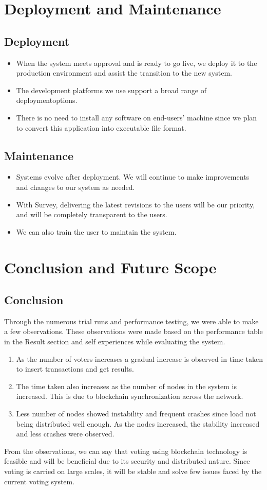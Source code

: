 \documentclass[oneside, 12pt]{book}
\begin{document}
	\section{Deployment and Maintenance}
	\newpage
		\subsection{Deployment}
			\begin{itemize}
				\item When the system meets approval and is ready to go live, we deploy it to the production environment and assist the transition to the new system.
				\item The development platforms we use support a broad range of deploymentoptions.
				\item There is no need to install any software on end-users’ machine since we plan to convert this application into executable file format.
			\end{itemize}
		\subsection{Maintenance}
			\begin{itemize}
				\item Systems evolve after deployment. We will continue to make improvements and changes to our system as needed.
				\item With Survey, delivering the latest revisions to the users will be our priority, and will be completely transparent to the users.
				\item We can also train the user to maintain the system.
			\end{itemize}
	\newpage
	\section{Conclusion and Future Scope}
	\newpage
		\subsection{Conclusion}
			Through the numerous trial runs and performance testing, we were able to make a few observations. These observations were made based on the performance table in the Result section and self experiences while evaluating the system.
			\begin{enumerate}
				\item As the number of voters increases a gradual increase is observed in time taken to insert transactions and get results.
				\item The time taken also increases as the number of nodes in the system is increased. This is due to blockchain synchronization across the network.
				\item Less number of nodes showed instability and frequent crashes since load not being distributed well enough. As the nodes increased, the stability increased and less crashes were observed.
			\end{enumerate}
			From the observations, we can say that voting using blockchain technology is feasible and will be beneficial due to its security and distributed nature. Since voting is carried on large scales, it will be stable and solve few issues faced by the current voting system.
\end{document}
